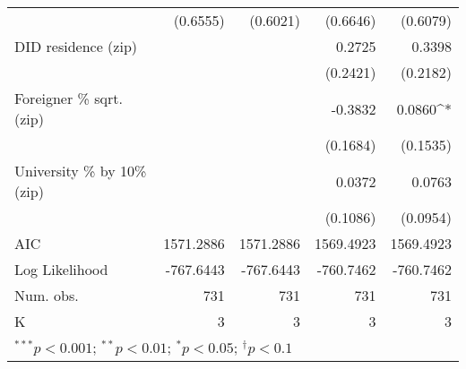 \begin{tabular}{l D{.}{.}{4.11} D{.}{.}{4.11} D{.}{.}{4.11} D{.}{.}{4.11}}
                                  & (0.6555)          & (0.6021)          & (0.6646)          & (0.6079)          \\
DID residence (zip)               &                   &                   & 0.2725            & 0.3398            \\
                                  &                   &                   & (0.2421)          & (0.2182)          \\
Foreigner \% sqrt. (zip)          &                   &                   & -0.3832           & 0.0860^{*}        \\
                                  &                   &                   & (0.1684)          & (0.1535)          \\
University \% by 10\% (zip)       &                   &                   & 0.0372            & 0.0763            \\
                                  &                   &                   & (0.1086)          & (0.0954)          \\
\midrule
AIC                               & 1571.2886         & 1571.2886         & 1569.4923         & 1569.4923         \\
Log Likelihood                    & -767.6443         & -767.6443         & -760.7462         & -760.7462         \\
Num. obs.                         & 731               & 731               & 731               & 731               \\
K                                 & 3                 & 3                 & 3                 & 3                 \\
\bottomrule
{}
\end{tabular}
